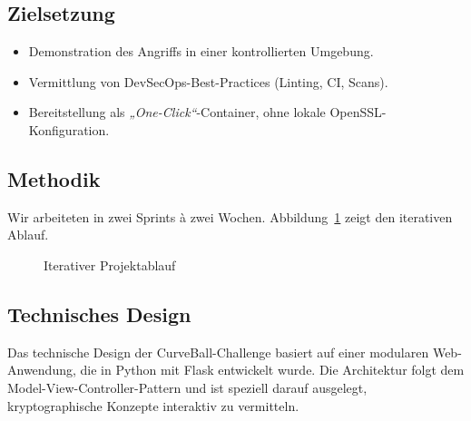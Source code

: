 \documentclass{article}
\begin{document}
\subsection{Zielsetzung}
\begin{itemize}
  \item Demonstration des Angriffs in einer kontrollierten Umgebung.
  \item Vermittlung von DevSecOps-Best-Practices (Linting, CI, Scans).
  \item Bereitstellung als \emph{„One-Click“}-Container, ohne lokale OpenSSL-Konfiguration.
\end{itemize}

\subsection{Methodik}
Wir arbeiteten in zwei Sprints à zwei Wochen.  
Abbildung~\ref{fig:process} zeigt den iterativen Ablauf.

\begin{figure}[H]
  \centering
  \caption{Iterativer Projektablauf}\label{fig:process}
\end{figure}

\newpage

\subsection{Technisches Design}
Das technische Design der CurveBall-Challenge basiert auf einer modularen Web-Anwendung, die in Python mit Flask entwickelt wurde. Die Architektur folgt dem Model-View-Controller-Pattern und ist speziell darauf ausgelegt, kryptographische Konzepte interaktiv zu vermitteln.
\end{document}
